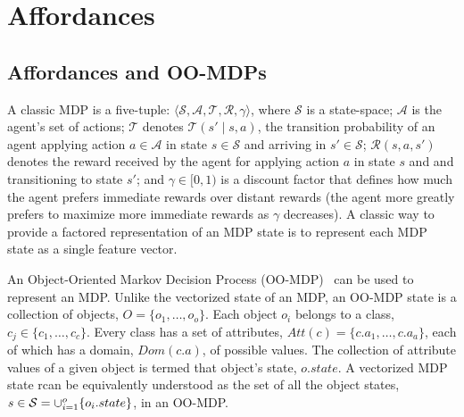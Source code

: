 \documentclass[conference]{IEEEtran}
\newcommand{\dnote}[1]{\textcolor{Green}{\textbf{D: #1}}}
\begin{document}



\section{Affordances}
\label{sec:affordances}

\subsection{Affordances and OO-MDPs}
A classic MDP is a
five-tuple: $\langle \mathcal{S}, \mathcal{A}, \mathcal{T},
\mathcal{R}, \gamma \rangle$, where $\mathcal{S}$ is a state-space;
$\mathcal{A}$ is the agent's set of actions; $\mathcal{T}$ denotes
$\mathcal{T}(s' \mid s,a)$, the transition probability of an agent
applying action $a \in \mathcal{A}$ in state $s \in \mathcal{S}$ and
arriving in $s' \in \mathcal{S}$; $\mathcal{R}(s,a,s')$ denotes the
reward received by the agent for applying action $a$ in state $s$ and
and transitioning to state $s'$; and $\gamma \in [0, 1)$ is a discount
  factor that defines how much the agent prefers immediate rewards
  over distant rewards (the agent more greatly prefers to maximize
  more immediate rewards as $\gamma$ decreases). A classic way to provide a factored representation of an MDP state is to represent
each MDP state as a single feature vector. 

An Object-Oriented Markov
Decision Process (OO-MDP)~\citep{diuk08} can be used to represent an MDP. Unlike the vectorized state of an MDP, an OO-MDP state is a collection of objects,
$O = \{o_1, \ldots, o_o \}$.  Each object $o_i$ belongs to a
class, $c_j \in  \{c_1, \ldots, c_c\}$. Every class has a set of attributes,
$Att(c) = \{c.a_1, \ldots, c.a_a \}$, each of which has a domain, $Dom(c.a)$, of possible values. The collection of attribute values of a given object is termed that object's state, $o.state$. A vectorized MDP state rcan be equivalently understood as the set
of all the object states, $s \in {\cal S} = \cup_{i = 1}^o \{o_i.state\}$, in an OO-MDP. 
\end{document}
